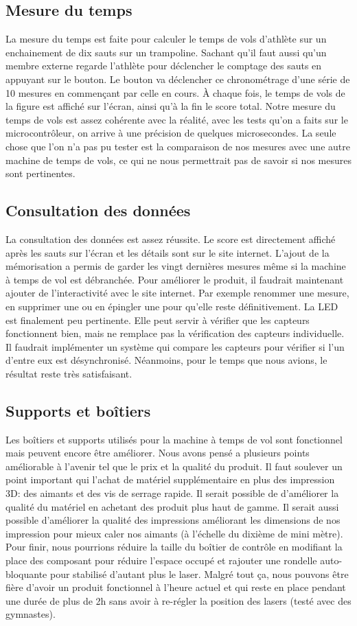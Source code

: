 \subsection{Mesure du temps}
La mesure du temps est faite pour calculer le temps de vols d'athlète sur un enchainement de dix sauts sur un trampoline. Sachant qu’il faut aussi qu'un membre externe regarde l’athlète pour déclencher le comptage des sauts en appuyant sur le bouton. Le bouton va déclencher ce chronométrage d'une série de 10 mesures en commençant par celle en cours. À chaque fois, le temps de vols de la figure est affiché sur l'écran, ainsi qu'à la fin le score total.
Notre mesure du temps de vols est assez cohérente avec la réalité, avec les tests qu’on a faits sur le microcontrôleur, on arrive à une précision de quelques microsecondes. La seule chose que l’on n’a pas pu tester est la comparaison de nos mesures avec une autre machine de temps de vols, ce qui ne nous permettrait pas de savoir si nos mesures sont pertinentes. 

\subsection{Consultation des données}
La consultation des données est assez réussite. Le score est directement affiché après les sauts sur l'écran et les détails sont sur le site internet. L'ajout de la mémorisation a permis de garder les vingt dernières mesures même si la machine à temps de vol est débranchée. Pour améliorer le produit, il faudrait maintenant ajouter de l'interactivité avec le site internet. Par exemple renommer une mesure, en supprimer une ou en épingler une pour qu'elle reste définitivement. La LED est finalement peu pertinente. Elle peut servir à vérifier que les capteurs fonctionnent bien, mais ne remplace pas la vérification des capteurs individuelle. Il faudrait implémenter un système qui compare les capteurs pour vérifier si l'un d'entre eux est désynchronisé. Néanmoins, pour le temps que nous avions, le résultat reste très satisfaisant.

\subsection{Supports et boîtiers}
Les boîtiers et supports utilisés pour la machine à temps de vol sont fonctionnel mais peuvent encore être améliorer. Nous avons pensé a plusieurs points améliorable à l'avenir tel que le prix et la qualité du produit. Il faut soulever un point important qui l’achat de matériel supplémentaire en plus des impression 3D: des aimants et des vis de serrage rapide. Il serait possible de d'améliorer la qualité du matériel en achetant des produit plus haut de gamme. Il serait aussi possible d'améliorer la qualité des impressions améliorant les dimensions de nos impression pour mieux caler nos aimants (à l'échelle du dixième de mini mètre). Pour finir, nous pourrions réduire la taille du boîtier de contrôle en modifiant la place des composant pour réduire l'espace occupé et rajouter une rondelle auto-bloquante pour stabilisé d'autant plus le laser. Malgré tout ça, nous pouvons être fière d'avoir un produit fonctionnel à l'heure actuel et qui reste en place pendant une durée de plus de 2h sans avoir à re-régler la position des lasers (testé avec des gymnastes).
